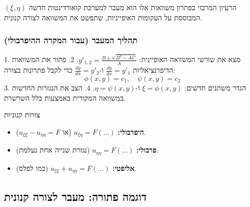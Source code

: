 הרעיון המרכזי בפתרון משוואות אלו הוא מעבר למערכת קואורדינטות חדשה $(\xi, \eta)$ המבוססת על העקומות האופייניות, שתפשט את המשוואה לצורה קנונית.

\subsubsection{תהליך המעבר (עבור המקרה ההיפרבולי)}
1. מצא את שורשי המשוואה האופיינית: $y'_{1,2} = \frac{B \pm \sqrt{B^2-AC}}{A}$.
2. פתור את המשוואות הדיפרנציאליות $\frac{dy}{dx} = y'_1$ ו-$\frac{dy}{dx} = y'_2$ כדי לקבל פתרונות בצורה:
   \[ \phi(x,y) = c_1, \quad \psi(x,y) = c_2 \]
3. הגדר משתנים חדשים: $\xi = \phi(x,y)$ ו-$\eta = \psi(x,y)$.
4. הצב את הנגזרות החדשות במשוואה המקורית באמצעות כלל השרשרת.

\begin{resultbox}{צורות קנוניות}
    \begin{itemize}
        \item \textbf{היפרבולי:} $u_{\xi\eta} = F(\dots)$ (או $u_{\xi\xi} - u_{\eta\eta} = F$).
        \item \textbf{פרבולי:} $u_{\eta\eta} = F(\dots)$ (נגזרת שנייה אחת נעלמת).
        \item \textbf{אליפטי:} $u_{\xi\xi} + u_{\eta\eta} = F(\dots)$ (כמו לפלס).
    \end{itemize}
\end{resultbox}

\subsection{דוגמה פתורה: מעבר לצורה קנונית}

